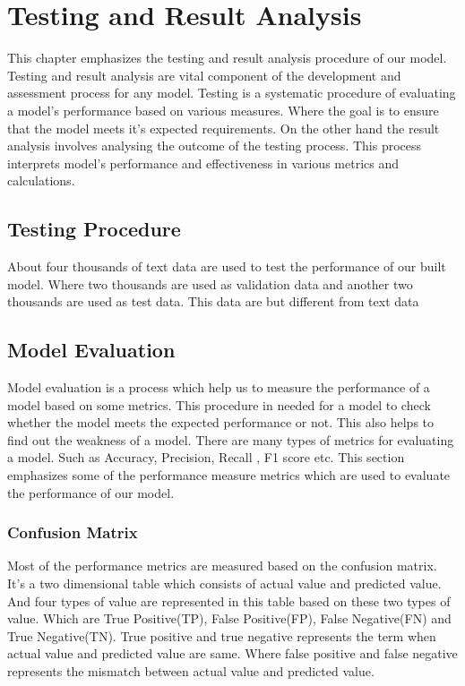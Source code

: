 \chapter{Testing and Result Analysis}
This chapter emphasizes the testing and result analysis procedure of our model. Testing and result analysis are vital component of the development and assessment process for any model. Testing is a systematic procedure of evaluating a model's performance based on various measures. Where the goal is to ensure that the model meets it's expected requirements. On the other hand the result analysis involves analysing the outcome of the testing process. This process interprets  model's performance and effectiveness in various metrics and calculations.

\section{Testing Procedure}
About four thousands of text data are used to test the performance of our built model. Where two thousands are used as validation data and another two thousands are used as test data. This data are  but different from text data

\section{Model Evaluation}
Model evaluation is a process which help us to measure the performance of a model based on some metrics. This procedure in needed for a model to check whether the model meets the expected performance or not. This also helps to find out the weakness of a model. There are many types of metrics for evaluating a model. Such as Accuracy, Precision, Recall , F1 score etc. This section emphasizes some of the performance measure metrics which are used to evaluate the performance of our model.
\subsection{Confusion Matrix}
Most of the performance metrics are measured based on the confusion matrix. It's a two dimensional table which consists of actual value and predicted value. And four types of value are represented in this table based on these two types of value. Which are True Positive(TP), False Positive(FP), False Negative(FN) and True Negative(TN). True positive and true negative represents the term when actual value and predicted value are same. Where false positive and false negative represents the mismatch between actual value and predicted value.

